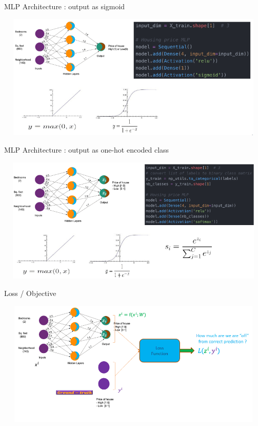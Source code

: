 \documentclass[aspectratio=169,14pt,usenames,dvipsnames]{beamer}
\begin{document}
\begin{frame}{MLP Architecture : output as sigmoid }

\includegraphics[width=14.5cm, height=6cm]{Keras_Images/Ker_15.png}

\end{frame}

\begin{frame}{MLP Architecture : output as one-hot encoded class}

\includegraphics[width=14.5cm, height=6cm]{Keras_Images/Ker_16.png}

\end{frame}

\begin{frame}{Loss / Objective}

\includegraphics[width=14.5cm, height=6cm]{Keras_Images/Ker_17.png}

\end{frame}
\end{document}
